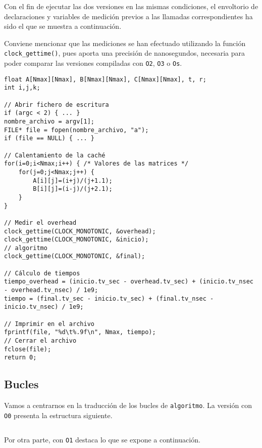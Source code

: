 \documentclass[11pt,a4paper,twoside]{article}
\theoremstyle{definition}
\begin{document}
	Con el fin de ejecutar las dos versiones en las mismas condiciones, el envoltorio de declaraciones y variables de medición previos a las llamadas correspondientes ha sido el que se muestra a continuación.
	
	Conviene mencionar que las mediciones se han efectuado utilizando la función \texttt{clock\_gettime()}, pues aporta una precisión de nanosegundos, necesaria para poder comparar las versiones compiladas con \texttt{O2}, \texttt{O3} o \texttt{Os}.
	
	\begin{verbatim}
float A[Nmax][Nmax], B[Nmax][Nmax], C[Nmax][Nmax], t, r;
int i,j,k;

// Abrir fichero de escritura
if (argc < 2) { ... }
nombre_archivo = argv[1];
FILE* file = fopen(nombre_archivo, "a");
if (file == NULL) { ... }

// Calentamiento de la caché
for(i=0;i<Nmax;i++) { /* Valores de las matrices */
	for(j=0;j<Nmax;j++) {
		A[i][j]=(i+j)/(j+1.1);
		B[i][j]=(i-j)/(j+2.1);
	}
}

// Medir el overhead
clock_gettime(CLOCK_MONOTONIC, &overhead);
clock_gettime(CLOCK_MONOTONIC, &inicio);
// algoritmo
clock_gettime(CLOCK_MONOTONIC, &final);

// Cálculo de tiempos
tiempo_overhead = (inicio.tv_sec - overhead.tv_sec) + (inicio.tv_nsec
- overhead.tv_nsec) / 1e9;
tiempo = (final.tv_sec - inicio.tv_sec) + (final.tv_nsec - inicio.tv_nsec) / 1e9;

// Imprimir en el archivo
fprintf(file, "%d\t%.9f\n", Nmax, tiempo);
// Cerrar el archivo
fclose(file);
return 0;
	\end{verbatim}

	\subsection{Bucles}
	
	Vamos a centrarnos en la traducción de los bucles de \texttt{algoritmo}. La versión con \texttt{O0} presenta la estructura siguiente.
	
	\begin{verbatim}

	\end{verbatim}

	Por otra parte, con \texttt{O1} destaca lo que se expone a continuación.
	
	\begin{verbatim}
		
	\end{verbatim}
	
\end{document}
